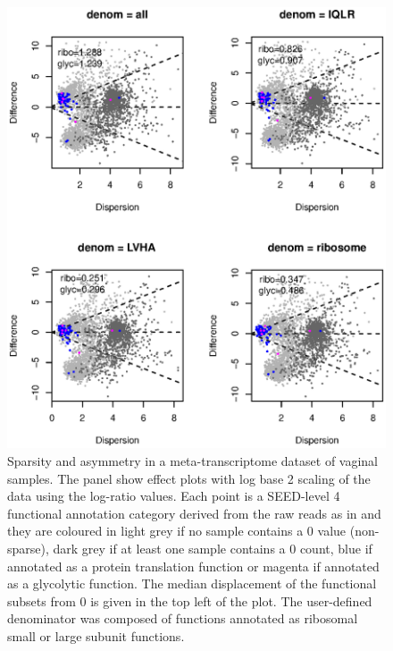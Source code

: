 \documentclass[graybox]{svmult}
\begin{document}
%
\begin{figure}[b]
\sidecaption[t]
\includegraphics[scale=.58]{MAx4-book.eps}
%
%
\caption{Sparsity and asymmetry in a meta-transcriptome dataset of vaginal samples.  The panel show effect plots with log base 2 scaling of the data using the log-ratio values. Each point is a SEED-level 4 functional annotation category derived from the raw reads as in \cite{Macklaim:2018aa} and they are coloured in light grey if no sample contains a 0 value (non-sparse), dark grey if at least one sample contains a 0 count, blue if annotated as a protein translation function or magenta if annotated as a glycolytic function. The median displacement of the functional subsets from 0 is given in the top left of the plot.  The user-defined denominator was composed of functions annotated as ribosomal small or large subunit functions.  }
\label{Fig:f3a}       %
\end{figure}
\end{document}
